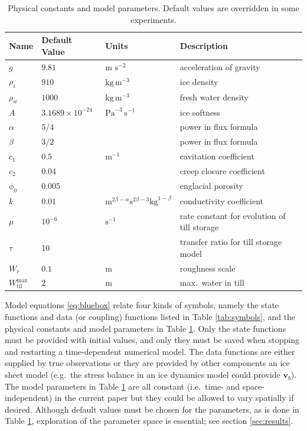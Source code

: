 \documentclass[11pt,final]{amsart}
\newcommand\bv{\mathbf{v}}
\newcommand{\Wtilmax}{W_{\text{til}}^{\text{max}}}
\begin{document}
\begin{table}[ht]
  \centering
  \caption{Physical constants and model parameters.  Default values are overridden in some experiments.}
  \begin{tabular}{lllp{3.0in}} 
    \textbf{Name} & \textbf{Default Value} & \textbf{Units} & \textbf{Description}\\
\hline
    $g$ & $9.81$ & m $\text{s}^{-2}$ & acceleration of gravity \\
    $\rho_i$ & $910$ & $\text{kg}\,\text{m}^{-3}$ & ice density \citep{GreveBlatter2009} \\
    $\rho_w$ & $1000$ & $\text{kg}\,\text{m}^{-3}$ & fresh water density \citep{GreveBlatter2009} \\
    \hline
    $A$ & $3.1689\times 10^{-24}$ & $\text{Pa}^{-3}\,\text{s}^{-1}$ & ice softness \citep{EISMINT96} \phantom{$\Big|$} \\
    $\alpha$ & $5/4$ & & power in flux formula  \citep{Hewittetal2012} \\
    $\beta$ & $3/2$ & & power in flux formula  \citep{Hewittetal2012} \\
    $c_1$ & $0.5$ & $\text{m}^{-1}$ & cavitation coefficient \\
    $c_2$ & $0.04$ & & creep closure coefficient \\
    $\phi_0$ & $0.005$ & & englacial porosity \citep{Bartholomausetal2011} \\
    $k$ & $0.01$ & $\text{m}^{2\beta-\alpha} \text{s}^{2\beta-3} \text{kg}^{1-\beta}$ & conductivity coefficient  \citep{Hewittetal2012} \\
    $\mu$ & $10^{-6}$ & $\text{s}^{-1}$ & rate constant for evolution of till storage \\
    $\tau$ & 10 & & transfer ratio for till storage model \\
    $W_r$ & $0.1$ & $\text{m}$ & roughness scale \citep{Hewittetal2012} \\
    $\Wtilmax$ & $2\phantom{\Big|}$ & $\text{m}$ & max.~water in till \citep{BBssasliding} \\
    \hline
  \end{tabular}
 \label{tab:constants}
\end{table}

Model equations \eqref{eq:bluebox} relate four kinds of symbols, namely the state functions and data (or coupling) functions listed in Table \ref{tab:symbols}, and the physical constants and model parameters in Table \ref{tab:constants}.  Only the state functions must be provided with initial values, and only they must be saved when stopping and restarting a time-dependent numerical model.  The data functions are either supplied by true observations or they are provided by other components an ice sheet model (e.g.~the stress balance in an ice dynamics model could provide $\bv_b$).  The model parameters in Table \ref{tab:constants} are all constant (i.e.~time- and space-independent) in the current paper but they could be allowed to vary spatially if desired.  Although default values must be chosen for the parameters, as is done in Table \ref{tab:constants}, exploration of the parameter space is essential; see section \ref{sec:results}.
\end{document}
